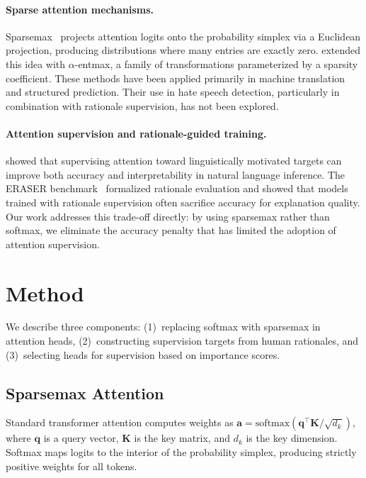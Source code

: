 \documentclass{article}
\begin{document}
\paragraph{Sparse attention mechanisms.}
Sparsemax~\citep{martins2016sparsemax} projects attention logits onto the
probability simplex via a Euclidean projection, producing distributions
where many entries are exactly zero. \citet{correia2019adaptively} extended
this idea with $\alpha$-entmax, a family of transformations parameterized
by a sparsity coefficient. These methods have been applied primarily in
machine translation and structured prediction. Their use in hate speech
detection, particularly in combination with rationale supervision, has not
been explored.

\paragraph{Attention supervision and rationale-guided training.}
\citet{ghaeini2018interpreting} showed that supervising attention toward
linguistically motivated targets can improve both accuracy and
interpretability in natural language inference. The ERASER
benchmark~\citep{deyoung2020eraser} formalized rationale evaluation and
showed that models trained with rationale supervision often sacrifice
accuracy for explanation quality. Our work addresses this trade-off
directly: by using sparsemax rather than softmax, we eliminate the
accuracy penalty that has limited the adoption of attention supervision.

\section{Method}
\label{sec:method}

We describe three components: (1)~replacing softmax with sparsemax in
attention heads, (2)~constructing supervision targets from human rationales,
and (3)~selecting heads for supervision based on importance scores.

\subsection{Sparsemax Attention}
\label{sec:sparsemax}

Standard transformer attention computes weights as
$\mathbf{a} = \text{softmax}(\mathbf{q}^\top \mathbf{K} / \sqrt{d_k})$,
where $\mathbf{q}$ is a query vector, $\mathbf{K}$ is the key matrix, and
$d_k$ is the key dimension. Softmax maps logits to the interior of the
probability simplex, producing strictly positive weights for all tokens.
\end{document}
